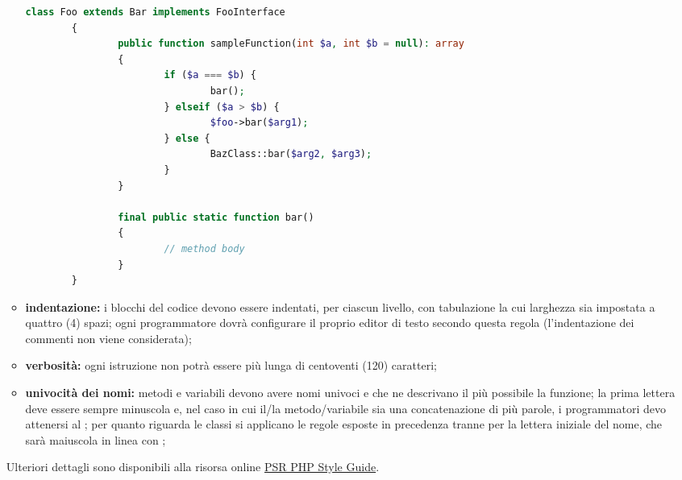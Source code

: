 \begin{itemize}
\begin{itemize}
\begin{lstlisting}[language=php,captionpos=b,caption={Esempio per la sintassi PHP}]
		class Foo extends Bar implements FooInterface
		{
				public function sampleFunction(int $a, int $b = null): array
				{
						if ($a === $b) {
								bar();
						} elseif ($a > $b) {
								$foo->bar($arg1);
						} else {
								BazClass::bar($arg2, $arg3);
						}
				}
		
				final public static function bar()
				{
						// method body
				}
		}
								\end{lstlisting}
								\item \textbf{indentazione:} i blocchi del codice devono essere indentati, per ciascun livello, con tabulazione la cui larghezza sia impostata a quattro (4) spazi; ogni programmatore dovrà configurare il proprio editor di testo secondo questa regola (l'indentazione dei commenti non viene considerata);
								\item \textbf{verbosità:} ogni istruzione non potrà essere più lunga di centoventi (120) caratteri;
								\item \textbf{univocità dei nomi:} metodi e variabili devono avere nomi univoci e che ne descrivano il più possibile la funzione; la prima lettera deve essere sempre minuscola e, nel caso in cui il/la metodo/variabile sia una concatenazione di più parole, i programmatori devo attenersi al ; per quanto riguarda le classi si applicano le regole esposte in precedenza tranne per la lettera iniziale del nome, che sarà maiuscola in linea con ;
							\end{itemize}
							Ulteriori dettagli sono disponibili alla risorsa online \href{https://www.php-fig.org/psr/psr-12}{PSR PHP Style Guide}.
					\end{itemize}
				
